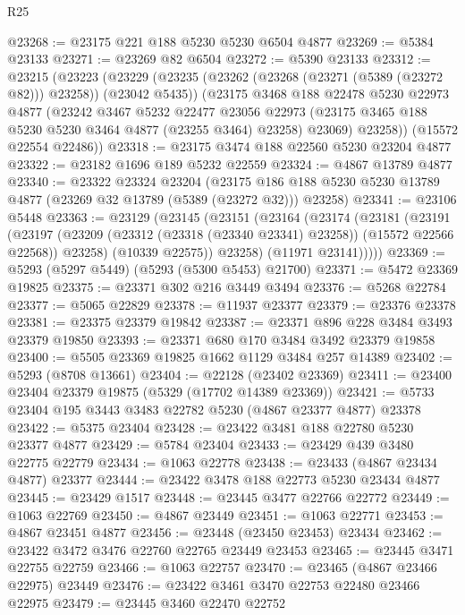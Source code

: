 \begin{lexlean}{R25}
\begin{coremodule}
@23268 := @23175 @221 @188 @5230 @5230 @6504 @4877
@23269 := @5384 @23133
@23271 := @23269 @82 @6504
@23272 := @5390 @23133
@23312 := @23215
    (@23223
      (@23229
        (@23235 (@23262 (@23268 (@23271 (@5389 (@23272 @82))) @23258)) (@23042 @5435))
        (@23175
          @3468
          @188
          @22478
          @5230
          @22973
          @4877
          (@23242
            @3467
            @5232
            @22477
            @23056
            @22973
            (@23175 @3465 @188 @5230 @5230 @3464 @4877 (@23255 @3464) @23258)
            @23069)
          @23258))
      (@15572 @22554 @22486))
@23318 := @23175 @3474 @188 @22560 @5230 @23204 @4877
@23322 := @23182 @1696 @189 @5232 @22559
@23324 := @4867 @13789 @4877
@23340 := @23322
    @23324
    @23204
    (@23175 @186 @188 @5230 @5230 @13789 @4877 (@23269 @32 @13789 (@5389 (@23272 @32))) @23258)
@23341 := @23106 @5448
@23363 := @23129
    (@23145
      (@23151
        (@23164
          (@23174
            (@23181
              (@23191
                (@23197
                  (@23209 (@23312 (@23318 (@23340 @23341) @23258)) (@15572 @22566 @22568))
                  @23258)
                (@10339 @22575))
              @23258)
            (@11971 @23141)))))
@23369 := @5293 (@5297 @5449) (@5293 (@5300 @5453) @21700)
@23371 := @5472 @23369 @19825
@23375 := @23371 @302 @216 @3449 @3494
@23376 := @5268 @22784
@23377 := @5065 @22829
@23378 := @11937 @23377
@23379 := @23376 @23378
@23381 := @23375 @23379 @19842
@23387 := @23371 @896 @228 @3484 @3493 @23379 @19850
@23393 := @23371 @680 @170 @3484 @3492 @23379 @19858
@23400 := @5505 @23369 @19825 @1662 @1129 @3484 @257 @14389
@23402 := @5293 (@8708 @13661)
@23404 := @22128 (@23402 @23369)
@23411 := @23400 @23404 @23379 @19875 (@5329 (@17702 @14389 @23369))
@23421 := @5733 @23404 @195 @3443 @3483 @22782 @5230 (@4867 @23377 @4877) @23378
@23422 := @5375 @23404
@23428 := @23422 @3481 @188 @22780 @5230 @23377 @4877
@23429 := @5784 @23404
@23433 := @23429 @439 @3480 @22775 @22779
@23434 := @1063 @22778
@23438 := @23433 (@4867 @23434 @4877) @23377
@23444 := @23422 @3478 @188 @22773 @5230 @23434 @4877
@23445 := @23429 @1517
@23448 := @23445 @3477 @22766 @22772
@23449 := @1063 @22769
@23450 := @4867 @23449
@23451 := @1063 @22771
@23453 := @4867 @23451 @4877
@23456 := @23448 (@23450 @23453) @23434
@23462 := @23422 @3472 @3476 @22760 @22765 @23449 @23453
@23465 := @23445 @3471 @22755 @22759
@23466 := @1063 @22757
@23470 := @23465 (@4867 @23466 @22975) @23449
@23476 := @23422 @3461 @3470 @22753 @22480 @23466 @22975
@23479 := @23445 @3460 @22470 @22752

\end{coremodule}
\end{lexlean}
